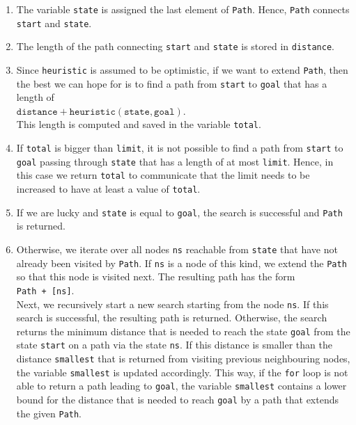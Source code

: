 \begin{enumerate}
\item The variable \texttt{state} is assigned the last element of \texttt{Path}.  Hence, \texttt{Path}
      connects \texttt{start} and \texttt{state}.
\item The length of the path connecting \texttt{start} and \texttt{state} is stored in 
      \texttt{distance}.
\item Since \texttt{heuristic} is assumed to be optimistic,  if we want to extend \texttt{Path}, then the best we
      can hope for is to find a path from \texttt{start} to \texttt{goal} that has a length of
      \\[0.2cm]
      \hspace*{1.3cm}
      $\texttt{distance} + \texttt{heuristic}(\texttt{state}, \texttt{goal})$.
      \\[0.2cm]
      This length is computed and saved in the variable \texttt{total}.
\item If \texttt{total} is bigger than \texttt{limit}, it is not possible to find a path from
      \texttt{start} to \texttt{goal} passing through \texttt{state} that has a length of at most
      \texttt{limit}.  Hence, in this case we return \texttt{total} to communicate that the limit needs to
      be increased to have at least a value of \texttt{total}.
\item If we are lucky and \texttt{state} is equal to \texttt{goal}, the search is successful and \texttt{Path}
      is returned. 
\item Otherwise, we iterate over all nodes \texttt{ns} reachable from \texttt{state} that have not already been visited
      by \texttt{Path}.  If \texttt{ns} is a node of this kind, we extend the \texttt{Path} so that
      this node is visited next.  The resulting path has the form
      \\[0.2cm]
      \hspace*{1.3cm}
      \texttt{Path + [ns]}.
      \\[0.2cm]
      Next, we recursively start a new search starting from the node \texttt{ns}.  If this search is
      successful, the resulting path is returned.  Otherwise, the search returns the minimum distance that is
      needed to reach the state \texttt{goal} from the state \texttt{start} on a path via the state
      \texttt{ns}.  If this distance is smaller than the distance \texttt{smallest} that is returned from
      visiting previous neighbouring nodes, the variable \texttt{smallest} is updated accordingly.
      This way, if the \texttt{for} loop is not able to return a path leading to \texttt{goal}, the variable
      \texttt{smallest} contains a lower bound for the distance that is needed to reach \texttt{goal} by a path that
      extends the given \texttt{Path}. 


\end{enumerate}
